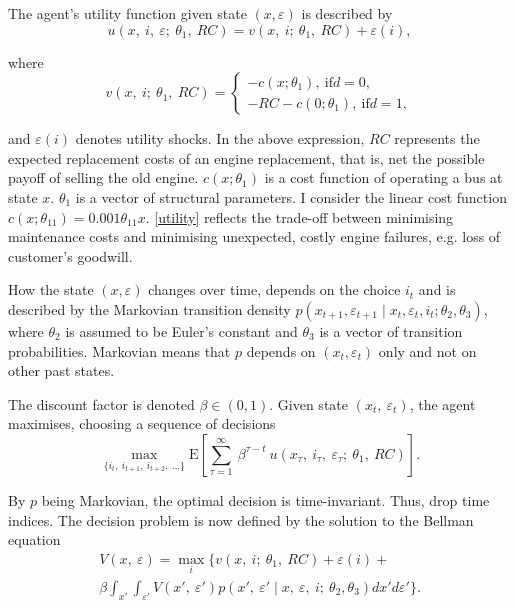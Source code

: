 The agent’s utility function given state $(x, \varepsilon)$ is described by
\begin{equation}
u(x,\ i,\ \varepsilon;\ \theta_1,\ RC)=v(x,\ i;\ \theta_1,\ RC)+\varepsilon(i),
\end{equation}

where
\begin{equation*} \label{utility}
v(x,\ i;\ \theta_1,\ RC)=
\begin{cases}
-c(x; \theta_1),\ \text{if} d=0,\\
-RC-c(0;\theta_1),\ \text{if} d=1,
\end{cases}
\end{equation*}

\noindent and $\varepsilon(i)$ denotes utility shocks. In the above expression, $RC$ represents the expected replacement costs of an engine replacement, that is, net the possible payoff of selling the old engine. $c(x; \theta_1)$ is a cost function of operating a bus at state $x$. $\theta_1$ is a vector of structural parameters. I consider the linear cost function $c(x; \theta_{11}) = 0.001 \theta_{11} x$.
\cref{utility} reflects the trade-off between minimising maintenance costs and minimising unexpected, costly engine failures, e.g. loss of customer's goodwill.

How the state $(x, \varepsilon)$ changes over time, depends on the choice $i_t$ and is described by the Markovian transition density $p(x_{t+1}, \varepsilon_{t+1} \mid x_t, \varepsilon_t, i_t; \theta_2, \theta_3)$, where $\theta_2$ is assumed to be Euler’s constant and $\theta_3$ is a vector of transition probabilities. Markovian means that $p$ depends on $ (x_t, \varepsilon_t) $ only and not on other past states.

The discount factor is denoted $\beta \in (0,1) $. Given state $ (x_t,\ \varepsilon_t) $, the agent maximises, choosing a sequence of decisions
\begin{equation}
\max_{\{i_t,\ i_{t+1},\ i_{t+2},\ ...\}}  \mathrm{E} \left[\sum_{\tau=1}^\infty\ \beta^{\tau-t}\ u(x_{\tau},\ i_{\tau},\ \varepsilon_{\tau};\ \theta_1,\ RC) \right].
\end{equation}

By $p$ being Markovian, the optimal decision is time-invariant. Thus, drop time indices. The decision problem is now defined by the solution to the Bellman equation
\begin{multline}
V(x,\ \varepsilon)=\max_i \{ v(x,\ i;\ \theta_1,\ RC)+\varepsilon(i) + \\
\beta \int_{x'} \int_{\varepsilon'} V(x',\ \varepsilon')p(x',\ \varepsilon' \mid x,\ \varepsilon,\ i;\ \theta_2, \theta_3)dx' d \varepsilon' \}.
\end{multline}

